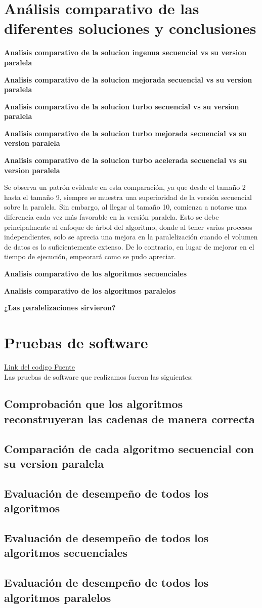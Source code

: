 \documentclass[conference]{IEEEtran}
\begin{document}
\section{\textbf{Análisis comparativo de las diferentes soluciones y conclusiones}}


\textbf{Analisis comparativo de la solucion ingenua secuencial vs su version paralela}


\textbf{Analisis comparativo de la solucion mejorada secuencial vs su version paralela}


\textbf{Analisis comparativo de la solucion turbo secuencial vs su version paralela}


\textbf{Analisis comparativo de la solucion turbo mejorada secuencial vs su version paralela}


\textbf{Analisis comparativo de la solucion turbo acelerada secuencial vs su version paralela}

Se observa un patrón evidente en esta comparación, ya que desde el tamaño 2 hasta el tamaño 9, siempre se muestra una superioridad de la versión secuencial sobre la paralela. Sin embargo, al llegar al tamaño 10, comienza a notarse una diferencia cada vez más favorable en la versión paralela. Esto se debe principalmente al enfoque de árbol del algoritmo, donde al tener varios procesos independientes, solo se aprecia una mejora en la paralelización cuando el volumen de datos es lo suficientemente extenso. De lo contrario, en lugar de mejorar en el tiempo de ejecución, empeorará como se pudo apreciar.

\textbf{Analisis comparativo de los algoritmos secuenciales}


\textbf{Analisis comparativo de los algoritmos paralelos}


\textbf{¿Las paralelizaciones sirvieron?}

\section{\textbf{Pruebas de software}}

\href{https://github.com/vicmaHo/proyecto-PF}
{Link del codigo Fuente} \\

Las pruebas de software que realizamos fueron las siguientes:

\subsection{Comprobación que los algoritmos reconstruyeran las cadenas de manera correcta}
\subsection{Comparación de cada algoritmo secuencial con su version paralela}
\subsection{Evaluación de desempeño de todos los algoritmos}
\subsection{Evaluación de desempeño de todos los algoritmos secuenciales}
\subsection{Evaluación de desempeño de todos los algoritmos paralelos}

 
\end{document}
